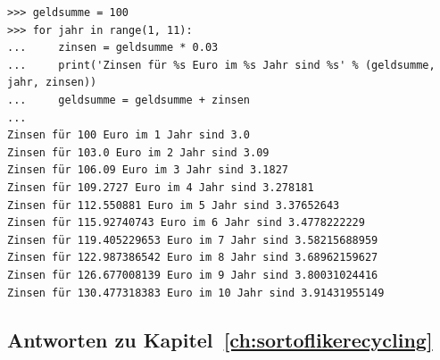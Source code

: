 \begin{Verbatim}[frame=single]
>>> geldsumme = 100
>>> for jahr in range(1, 11):
...     zinsen = geldsumme * 0.03
...     print('Zinsen für %s Euro im %s Jahr sind %s' % (geldsumme, jahr, zinsen))
...     geldsumme = geldsumme + zinsen
...
Zinsen für 100 Euro im 1 Jahr sind 3.0
Zinsen für 103.0 Euro im 2 Jahr sind 3.09
Zinsen für 106.09 Euro im 3 Jahr sind 3.1827
Zinsen für 109.2727 Euro im 4 Jahr sind 3.278181
Zinsen für 112.550881 Euro im 5 Jahr sind 3.37652643
Zinsen für 115.92740743 Euro im 6 Jahr sind 3.4778222229
Zinsen für 119.405229653 Euro im 7 Jahr sind 3.58215688959
Zinsen für 122.987386542 Euro im 8 Jahr sind 3.68962159627
Zinsen für 126.677008139 Euro im 9 Jahr sind 3.80031024416
Zinsen für 130.477318383 Euro im 10 Jahr sind 3.91431955149
\end{Verbatim}

\subsection*{Antworten zu Kapitel~\ref{ch:sortoflikerecycling}}

\noindent
